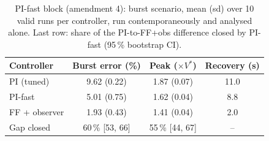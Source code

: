\begin{table}[t]\centering\footnotesize
\caption{PI-fast block (amendment 4): burst scenario, mean (sd) over 10 valid runs per controller, run contemporaneously and analysed alone. Last row: share of the PI-to-FF+obs difference closed by PI-fast (95\,\% bootstrap CI).}\label{tab:pifast}
\begin{tabular}{lccc}\toprule
Controller & Burst error (\%) & Peak ($\times V^*$) & Recovery (s)\\\midrule
PI (tuned) & 9.62 (0.22) & 1.87 (0.07) & 11.0\\
PI-fast & 5.01 (0.75) & 1.62 (0.04) & 8.8\\
FF + observer & 1.93 (0.43) & 1.41 (0.04) & 2.0\\\midrule
Gap closed & 60\,\% [53, 66] & 55\,\% [44, 67] & --\\
\bottomrule\end{tabular}\end{table}
